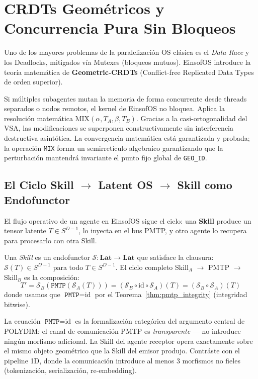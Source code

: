 \section{CRDTs Geométricos y Concurrencia Pura Sin Bloqueos}
Uno de los mayores problemas de la paralelización OS clásica es el \textit{Data Race} y los Deadlocks, mitigados vía Mutexes (bloqueos mutuos). EinsofOS introduce la teoría matemática de \textbf{Geometric-CRDTs} (Conflict-free Replicated Data Types de orden superior).

Si múltiples subagentes mutan la memoria de forma concurrente desde threads separados o nodos remotos, el kernel de EinsofOS no bloquea. Aplica la resolución matemática $\text{MIX}(\alpha, T_A, \beta, T_B)$. Gracias a la casi-ortogonalidad del VSA, las modificaciones se superponen constructivamente sin interferencia destructiva asintótica. La convergencia matemática está garantizada y probada; la operación \texttt{MIX} forma un semirretículo algebraico garantizando que la perturbación mantendrá invariante el punto fijo global de \texttt{GEO\_ID}.

\subsection{El Ciclo Skill $\to$ Latent OS $\to$ Skill como Endofunctor}
\label{sec:skill_endofunctor}

El flujo operativo de un agente en EinsofOS sigue el ciclo:
una \textbf{Skill} produce un tensor latente $T \in S^{D-1}$, lo inyecta 
en el bus PMTP, y otro agente lo recupera para procesarlo con otra Skill.

\begin{definition}
\label{def:skill_endofunctor}
Una \emph{Skill} es un endofunctor $\mathcal{S}: \mathbf{Lat} \to \mathbf{Lat}$
que satisface la clausura: $\mathcal{S}(T) \in S^{D-1}$ para todo 
$T \in S^{D-1}$. El ciclo completo Skill$_A$ $\to$ PMTP $\to$ Skill$_B$ 
es la composición:
\begin{equation}
T' = \mathcal{S}_B\!\left(\texttt{PMTP}(\mathcal{S}_A(T))\right) 
= (\mathcal{S}_B \circ \text{id} \circ \mathcal{S}_A)(T)
= (\mathcal{S}_B \circ \mathcal{S}_A)(T)
\end{equation}
donde usamos que $\texttt{PMTP} = \text{id}$ por el 
Teorema~\ref{thm:pmtp_integrity} (integridad bitwise).
\end{definition}

\begin{remark}
\label{rem:skill_significance}
La ecuación $\texttt{PMTP} = \text{id}$ es la formalización categórica
del argumento central de POLYDIM: el canal de comunicación PMTP es
\emph{transparente} --- no introduce ningún morfismo adicional. La Skill 
del agente receptor opera exactamente sobre el mismo objeto geométrico que
la Skill del emisor produjo. Contráste con el pipeline 1D, donde la 
comunicación introduce al menos 3 morfismos no fieles (tokenización, 
serialización, re-embedding).
\end{remark}

